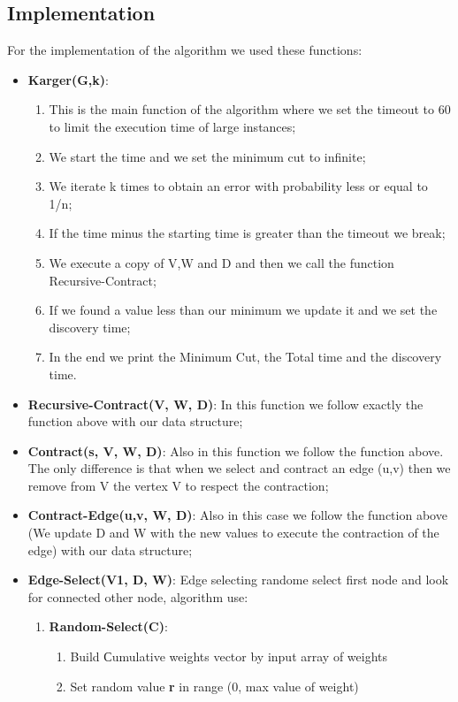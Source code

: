 \subsection{Implementation}
For the implementation of the algorithm we used these functions:
\begin{itemize}
	\item  \textbf{Karger(G,k)}: 
		\begin{enumerate}
		\item  This is the main function of the algorithm where we set the timeout to 60 to limit the execution time of large instances;
		\item  We start the time and we set the minimum cut to infinite;
		\item  We iterate k times to obtain an error with probability less or equal to 1/n;
		\item  If the time minus the starting time is greater than the timeout we break;
		\item  We execute a copy of V,W and D and then we call the function Recursive-Contract;
		\item  If we found a value less than our minimum we update it  and we set the discovery time;
		\item  In the end we print the Minimum Cut, the Total time and the discovery time.
		\end{enumerate}
	\item  \textbf{Recursive-Contract(V, W, D)}: In this function we follow exactly the function above with our data structure;
	\item  \textbf{Contract(s, V,  W, D)}: Also in this function we follow the function above. The only difference is that when we select and contract an edge (u,v) then we remove from V the vertex V to respect the contraction;
	\item  \textbf{Contract-Edge(u,v, W, D)}: Also in this case we follow the function above (We update D and W with the new values to execute the contraction of the edge) with our data structure;
	\item  \textbf{Edge-Select(V1, D, W)}: Edge selecting randome select first node and look for connected other node, algorithm use:
	\begin{enumerate}
		\item  \textbf{Random-Select(C)}:
			\begin{enumerate}
			\item  Build Сumulative weights vector by input array of weights
			\item  Set random value \textbf{r} in range (0, max value of weight)

\end{enumerate}
\end{enumerate}
\end{itemize}
